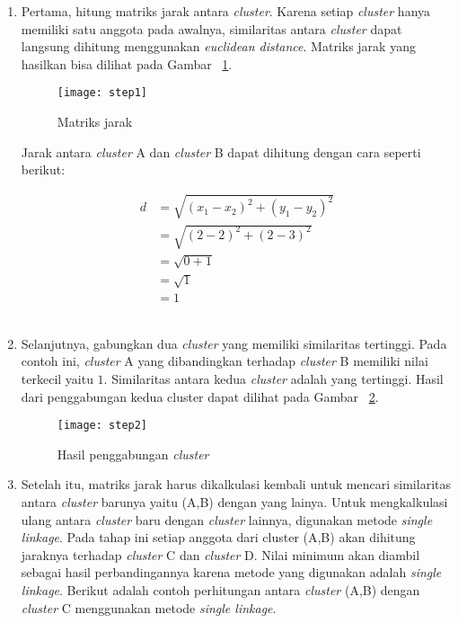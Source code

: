\begin{enumerate}

\item Pertama, hitung matriks jarak antara \textit{cluster}. Karena setiap \textit{cluster} hanya memiliki satu anggota pada awalnya, similaritas antara \textit{cluster} dapat langsung dihitung  menggunakan \textit{euclidean distance}. Matriks jarak yang hasilkan bisa dilihat pada Gambar ~\ref{fig:step1}.

\begin{figure}[H]
    \centering  
    \texttt{[image: step1]}  
    \caption[Matriks jarak]{Matriks jarak} 
    \label{fig:step1} 
\end{figure}

Jarak antara \textit{cluster} A dan \textit{cluster} B dapat dihitung dengan cara seperti berikut:


\begin{align}
d & = \sqrt{(x_{1} - x_{2})^2+(y_{1} - y_{2})^2} \\
& = \sqrt{(2 - 2)^2+(2 - 3)^2} \\
& = \sqrt{0 + 1} \\
& = \sqrt{1} \\
& = 1 
\end{align}\\


\item Selanjutnya, gabungkan dua \textit{cluster} yang memiliki similaritas tertinggi. Pada contoh ini,  \textit{cluster} A yang dibandingkan terhadap \textit{cluster} B memiliki nilai terkecil yaitu $1$. Similaritas antara kedua \textit{cluster} adalah yang tertinggi. Hasil dari penggabungan kedua cluster dapat dilihat pada Gambar ~\ref{fig:step2}.

\begin{figure}[H]
    \centering  
    \texttt{[image: step2]}  
    \caption[Hasil penggabungan \textit{cluster}]{Hasil penggabungan \textit{cluster}} 
    \label{fig:step2} 
\end{figure}

\item Setelah itu, matriks jarak harus dikalkulasi kembali untuk mencari similaritas antara \textit{cluster} barunya yaitu (A,B) dengan yang lainya. Untuk mengkalkulasi ulang antara \textit{cluster} baru dengan \textit{cluster} lainnya, digunakan metode \textit{single linkage}. Pada tahap ini setiap anggota dari cluster (A,B) akan dihitung jaraknya terhadap \textit{cluster} C dan \textit{cluster} D. Nilai minimum akan diambil sebagai hasil perbandingannya karena metode yang digunakan adalah \textit{single linkage}. Berikut adalah contoh perhitungan antara \textit{cluster} (A,B) dengan \textit{cluster} C menggunakan metode \textit{single linkage}.



\end{enumerate}
